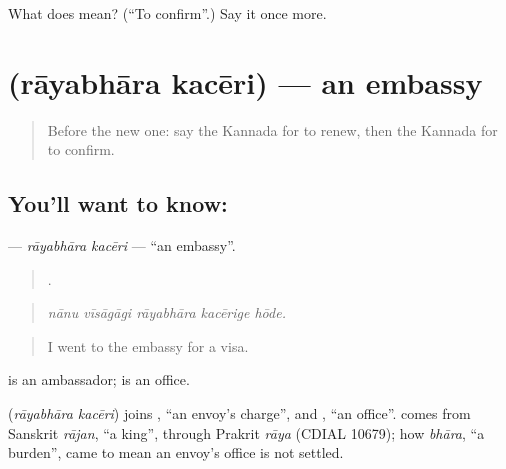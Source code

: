 \begin{tcolorbox}[breakable,colback=teal!4,colframe=teal!35!black,title={Before you move on}]
What does  mean? (\textquotedblleft{}To confirm\textquotedblright{}.) Say it once more.
\end{tcolorbox}
\section[\texorpdfstring{\kn{ರಾಯಭಾರ} \kn{ಕಚೇರಿ} (rāyabhāra kacēri)}{ರಾಯಭಾರ ಕಚೇರಿ (rāyabhāra kacēri)}]{  (rāyabhāra kacēri) — an embassy}

\label{lesson:KA-C440-rayabhara-kaceri}



\begin{quote}
Before the new one: say the Kannada for to renew, then the Kannada for to confirm.
\end{quote}

\subsection*{You'll want to know:  }
\textbf{ } — \emph{rāyabhāra kacēri} — \textquotedblleft{}an embassy\textquotedblright{}.

\begin{quote}
    .
\end{quote}

\begin{quote}
\emph{nānu vīsāgāgi rāyabhāra kacērige hōde.}
\end{quote}

\begin{quote}
I went to the embassy for a visa.
\end{quote}

 is an ambassador;  is an office.

\begin{cousinweb}
\textbf{ } (\emph{rāyabhāra kacēri}) joins , \textquotedblleft{}an envoy's charge\textquotedblright{}, and , \textquotedblleft{}an office\textquotedblright{}.  comes from Sanskrit \emph{rājan}, \textquotedblleft{}a king\textquotedblright{}, through Prakrit \emph{rāya} (CDIAL 10679); how \emph{bhāra}, \textquotedblleft{}a burden\textquotedblright{}, came to mean an envoy's office is not settled.
\end{cousinweb}

